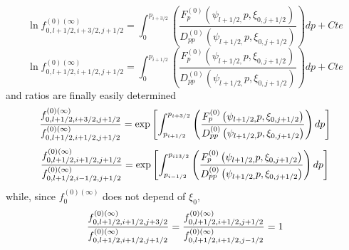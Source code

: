 \begin{equation}
\ln f_{0,l+1/2,i+3/2,j+1/2}^{\left( 0\right) (\infty
)}=\int_{0}^{p_{i+3/2}}\left( \frac{F_{p}^{\left( 0\right) }\left( \psi
_{l+1/2,}p,\xi _{0,j+1/2}\right) }{D_{pp}^{\left( 0\right) }\left( \psi
_{l+1/2,}p,\xi _{0,j+1/2}\right) }\right) dp+Cte
\end{equation}
\begin{equation}
\ln f_{0,l+1/2,i+1/2,j+1/2}^{\left( 0\right) (\infty
)}=\int_{0}^{p_{i+1/2}}\left( \frac{F_{p}^{\left( 0\right) }\left( \psi
_{l+1/2,}p,\xi _{0,j+1/2}\right) }{D_{pp}^{\left( 0\right) }\left( \psi
_{l+1/2,}p,\xi _{0,j+1/2}\right) }\right) dp+Cte
\end{equation}
and ratios are finally easily determined
\begin{equation}
\frac{f_{0,l+1/2,i+3/2,j+1/2}^{\left( 0\right) (\infty )}}{%
f_{0,l+1/2,i+1/2,j+1/2}^{\left( 0\right) (\infty )}}=\exp \left[
\int_{p_{i+1/2}}^{p_{i+3/2}}\left( \frac{F_{p}^{\left( 0\right) }\left( \psi
_{l+1/2,}p,\xi _{0,j+1/2}\right) }{D_{pp}^{\left( 0\right) }\left( \psi
_{l+1/2,}p,\xi _{0,j+1/2}\right) }\right) dp\right]
\end{equation}
\begin{equation}
\frac{f_{0,l+1/2,i+1/2,j+1/2}^{\left( 0\right) (\infty )}}{%
f_{0,l+1/2,i-1/2,j+1/2}^{\left( 0\right) (\infty )}}=\exp \left[
\int_{p_{i-1/2}}^{p_{i13/2}}\left( \frac{F_{p}^{\left( 0\right) }\left( \psi
_{l+1/2,}p,\xi _{0,j+1/2}\right) }{D_{pp}^{\left( 0\right) }\left( \psi
_{l+1/2,}p,\xi _{0,j+1/2}\right) }\right) dp\right]
\end{equation}
while, since $f_{0}^{\left( 0\right) (\infty )}$ does not depend of $\xi
_{0},$
\begin{equation}
\frac{f_{0,l+1/2,i+1/2,j+3/2}^{\left( 0\right) (\infty )}}{%
f_{0,l+1/2,i+1/2,j+1/2}^{\left( 0\right) (\infty )}}=\frac{%
f_{0,l+1/2,i+1/2,j+1/2}^{\left( 0\right) (\infty )}}{%
f_{0,l+1/2,i+1/2,j-1/2}^{\left( 0\right) (\infty )}}=1
\end{equation}

